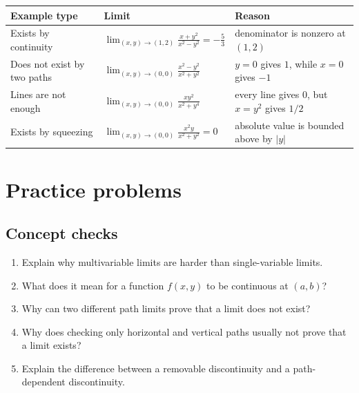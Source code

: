 \documentclass[11pt]{article}
\begin{document}
\begin{center}
\begin{tabular}{@{}>{\raggedright\arraybackslash}p{}>{\raggedright\arraybackslash}p{}>{\raggedright\arraybackslash}p{}@{}}
\toprule
Example type & Limit & Reason \\
\midrule
Exists by continuity & $\displaystyle \lim_{(x,y)\to(1,2)}\frac{x+y^2}{x^2-y^2}=-\frac53$ & denominator is nonzero at $(1,2)$ \\
Does not exist by two paths & $\displaystyle \lim_{(x,y)\to(0,0)}\frac{x^2-y^2}{x^2+y^2}$ & $y=0$ gives $1$, while $x=0$ gives $-1$ \\
Lines are not enough & $\displaystyle \lim_{(x,y)\to(0,0)}\frac{xy^2}{x^2+y^4}$ & every line gives $0$, but $x=y^2$ gives $1/2$ \\
Exists by squeezing & $\displaystyle \lim_{(x,y)\to(0,0)}\frac{x^2y}{x^2+y^2}=0$ & absolute value is bounded above by $|y|$ \\
\bottomrule
\end{tabular}
\end{center}

\section{Practice problems}

\subsection*{Concept checks}
\begin{enumerate}
  \item Explain why multivariable limits are harder than single-variable limits.
  \item What does it mean for a function $f(x,y)$ to be continuous at $(a,b)$?
  \item Why can two different path limits prove that a limit does not exist?
  \item Why does checking only horizontal and vertical paths usually not prove that a limit exists?
  \item Explain the difference between a removable discontinuity and a path-dependent discontinuity.
\end{enumerate}
\end{document}
